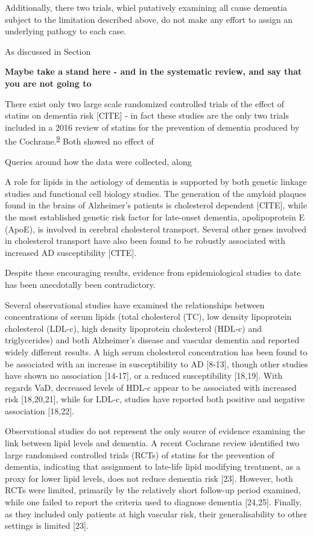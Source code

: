 \documentclass[a4paper, twoside]{templates/ociamthesis}
\begin{document}
Additionally, there two trials, whiel putatively examining all cause dementia subject to the limitation described above, do not make any effort to assign an underlying pathogy to each case.

As discussed in Section

\textbf{Maybe take a stand here - and in the systematic review, and say that you are not going to }

There exist only two large scale randomized controlled trials of the effect of statins on dementia risk {[}CITE{]} - in fact these studies are the only two trials included in a 2016 review of statins for the prevention of dementia produced by the Cochrane.\textsuperscript{\protect\hyperlink{ref-mcguinness2016b}{9}} Both showed no effect of

Queries around how the data were collected, along

A role for lipids in the aetiology of dementia is supported by both genetic linkage studies and functional cell biology studies. The generation of the amyloid plaques found in the brains of Alzheimer's patients is cholesterol dependent {[}CITE{]}, while the most established genetic risk factor for late-onset dementia, apolipoprotein E (ApoE), is involved in cerebral cholesterol transport. Several other genes involved in cholesterol transport have also been found to be robustly associated with increased AD susceptibility {[}CITE{]}.

Despite these encouraging results, evidence from epidemiological studies to date has been anecdotally been contradictory.

Several observational studies have examined the relationships between concentrations of serum lipids (total cholesterol (TC), low density lipoprotein cholesterol (LDL-c), high density lipoprotein cholesterol (HDL-c) and triglycerides) and both Alzheimer's disease and vascular dementia and reported widely different results. A high serum cholesterol concentration has been found to be associated with an increase in susceptibility to AD {[}8-13{]}, though other studies have shown no association {[}14-17{]}, or a reduced susceptibility {[}18,19{]}. With regards VaD, decreased levels of HDL-c appear to be associated with increased risk {[}18,20,21{]}, while for LDL-c, studies have reported both positive and negative association {[}18,22{]}.

Observational studies do not represent the only source of evidence examining the link between lipid levels and dementia. A recent Cochrane review identified two large randomised controlled trials (RCTs) of statins for the prevention of dementia, indicating that assignment to late-life lipid modifying treatment, as a proxy for lower lipid levels, does not reduce dementia risk {[}23{]}. However, both RCTs were limited, primarily by the relatively short follow-up period examined, while one failed to report the criteria used to diagnose dementia {[}24,25{]}. Finally, as they included only patients at high vascular risk, their generalisability to other settings is limited {[}23{]}.
\end{document}
